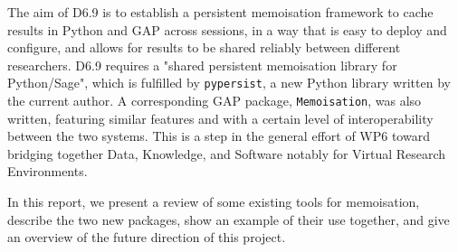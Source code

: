 The aim of D6.9 is to establish a persistent memoisation framework to
cache results in Python and GAP across sessions, in a way that is easy
to deploy and configure, and allows for results to be shared reliably
between different researchers. D6.9 requires a "shared persistent
memoisation library for Python/Sage", which is fulfilled by
\texttt{pypersist}, a new Python library written by the current author.
A corresponding GAP package, \texttt{Memoisation}, was also written,
featuring similar features and with a certain level of interoperability
between the two systems. This is a step in the general effort of WP6
toward bridging together Data, Knowledge, and Software notably for
Virtual Research Environments.

In this report, we present a review of some existing tools for
memoisation, describe the two new packages, show an example of their use
together, and give an overview of the future direction of this project.
